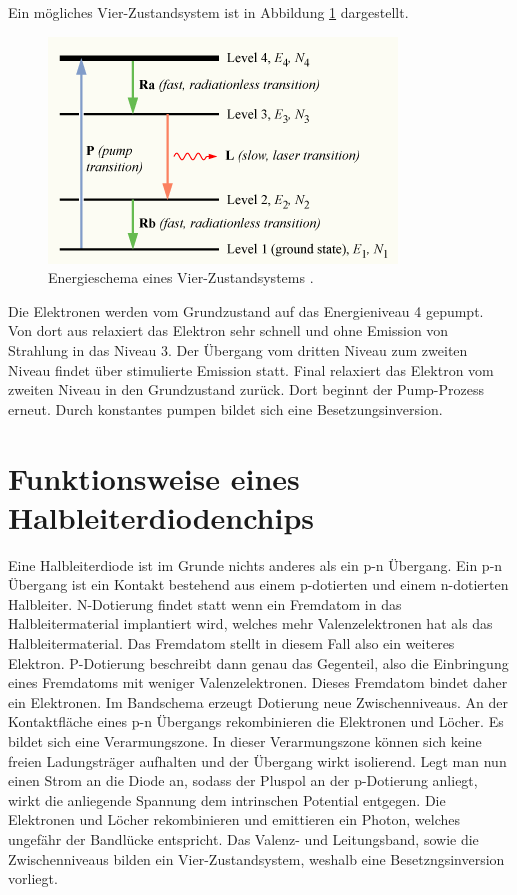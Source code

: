 Ein mögliches Vier-Zustandsystem ist in Abbildung \ref{fig:4Niveau} dargestellt. 

\begin{figure}
    \centering
    \includegraphics[scale=0.58]{bilder/Population-inversion-4level.png}
    \caption{Energieschema eines Vier-Zustandsystems \cite{wikipedia_population_inversion}.}
    \label{fig:4Niveau}
\end{figure}

Die Elektronen werden vom Grundzustand auf das Energieniveau 4 gepumpt. Von dort aus relaxiert das Elektron sehr schnell und ohne Emission von Strahlung in das Niveau 3. Der Übergang 
vom dritten Niveau zum zweiten Niveau findet über stimulierte Emission statt. Final relaxiert das Elektron vom zweiten Niveau in den Grundzustand zurück. Dort beginnt der Pump-Prozess
erneut. Durch konstantes pumpen bildet sich eine Besetzungsinversion. 

\section{Funktionsweise eines Halbleiterdiodenchips}
\label{sec:func_chip}

Eine Halbleiterdiode ist im Grunde nichts anderes als ein p-n Übergang. Ein p-n Übergang ist ein Kontakt bestehend aus einem p-dotierten und einem n-dotierten Halbleiter. N-Dotierung 
findet statt wenn ein Fremdatom in das Halbleitermaterial implantiert wird, welches mehr Valenzelektronen hat als das Halbleitermaterial. Das Fremdatom stellt in diesem Fall also ein
weiteres Elektron. P-Dotierung beschreibt dann genau das Gegenteil, also die Einbringung eines Fremdatoms mit weniger Valenzelektronen. Dieses Fremdatom bindet daher ein Elektronen.
Im Bandschema erzeugt Dotierung neue Zwischenniveaus. An der Kontaktfläche eines p-n Übergangs rekombinieren die Elektronen und Löcher. Es bildet sich eine Verarmungszone. In dieser 
Verarmungszone können sich keine freien Ladungsträger aufhalten und der Übergang wirkt isolierend. Legt man nun einen Strom an die Diode an, sodass der Pluspol an der p-Dotierung
anliegt, wirkt die anliegende Spannung dem intrinschen Potential entgegen. Die Elektronen und Löcher rekombinieren und emittieren ein Photon, welches ungefähr der Bandlücke entspricht. 
Das Valenz- und Leitungsband, sowie die Zwischenniveaus bilden ein Vier-Zustandsystem, weshalb eine Besetzngsinversion vorliegt. 

